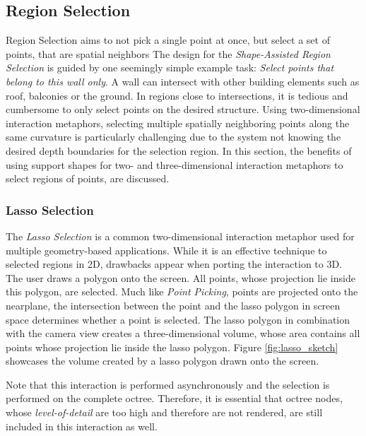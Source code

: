 \subsection{Region Selection}
\label{sec:regionSelection}

Region Selection aims to not pick a single point at once, but select a set of points, that are spatial neighbors
The design for the \textit{Shape-Assisted Region Selection} is guided by one seemingly simple example task: \textit{Select points that belong to this wall only}. A wall can intersect with other building elements such as roof, balconies or the ground. In regions close to intersections, it is tedious and cumbersome to only select points on the desired structure. Using two-dimensional interaction metaphors, selecting multiple spatially neighboring points along the same curvature is particularly challenging due to the system not knowing the desired depth boundaries for the selection region. In this section, the benefits of using support shapes for two- and three-dimensional interaction metaphors to select regions of points,  are discussed. 


\subsubsection{Lasso Selection}

The \textit{Lasso Selection} is a common two-dimensional interaction metaphor used for multiple geometry-based applications. While it is an effective technique to selected regions in 2D, drawbacks appear when porting the interaction to 3D. The user draws a polygon onto the screen. All points, whose projection lie inside this polygon, are selected. Much like \textit{Point Picking}, points are projected onto the nearplane, the intersection between the point and the lasso polygon in screen space determines whether a point is selected. The lasso polygon in combination with the camera view creates a three-dimensional volume, whose area contains all points whose projection lie inside the lasso polygon. Figure \ref{fig:lasso_sketch} showcases the volume created by a lasso polygon drawn onto the screen.

Note that this interaction is performed asynchronously and the selection is performed on the complete octree. Therefore, it is essential that octree nodes, whose \textit{level-of-detail} are too high and therefore are not rendered, are still included in this interaction as well. 


